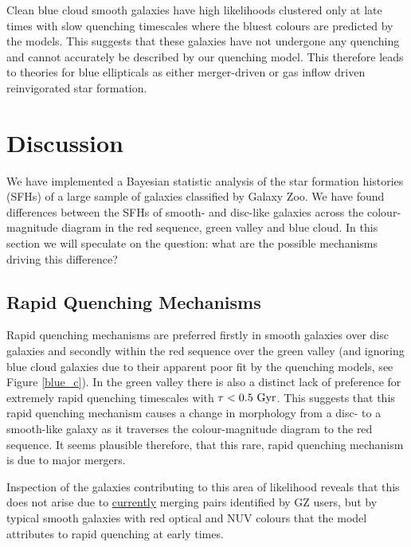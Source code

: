 \documentclass[useAMS,usenatbib]{mn2e}
\def\changed    {\color{titlecol} }
\begin{document}
Clean blue cloud smooth galaxies have high likelihoods clustered only at late times with slow quenching timescales where the bluest colours are predicted by the models. This suggests that these galaxies have not undergone any quenching and cannot accurately be described by our quenching model. This therefore leads to theories for blue ellipticals as either merger-driven or gas inflow driven reinvigorated star formation.


\section{Discussion}\label{diss}

We have implemented a Bayesian statistic analysis of the star formation histories (SFHs) of a large sample of galaxies classified by Galaxy Zoo. We have found differences between the SFHs of smooth- and disc-like galaxies across the colour-magnitude diagram in the red sequence, green valley and blue cloud. In this section we will speculate on the question: what are the possible mechanisms driving this difference? 

\subsection{Rapid Quenching Mechanisms}

{\changed Rapid quenching mechanisms are preferred firstly in smooth galaxies over disc galaxies and secondly within the red sequence over the green valley (and ignoring blue cloud galaxies due to their apparent poor fit by the quenching models, see Figure \ref{blue_c}). In the green valley there is also a distinct lack of preference for extremely rapid quenching timescales with $\tau < 0.5~\rm{Gyr}$.} This suggests that this rapid quenching mechanism causes a change in morphology from a disc- to a smooth-like galaxy as it traverses the colour-magnitude diagram to the red sequence. It seems plausible therefore, that this rare, rapid quenching mechanism is due to major mergers.


Inspection of the galaxies contributing to this area of likelihood reveals that this does not arise due to \underline{currently} merging pairs identified by GZ users, but by typical smooth galaxies with red optical and NUV colours that the model attributes to rapid quenching at early times.
\end{document}
